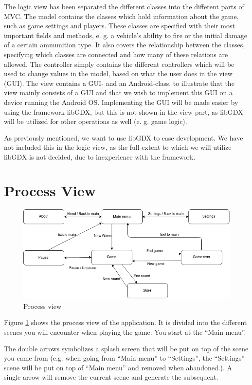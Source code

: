 The logic view has been separated the different classes into the different parts of MVC. The model contains the classes which hold information about the game, such as game settings and players. These classes are specified with their most important fields and methods, e. g. a vehicle’s ability to fire or the initial damage of a certain ammunition type. It also covers the relationship between the classes, specifying which classes are connected and how many of these relations are allowed.
The controller simply contains the different controllers which will be used to change values in the model, based on what the user does in the view (GUI).
The view contains a GUI- and an Android-class, to illustrate that the view mainly consists of a GUI and that we wish to implement this GUI on a device running the Android OS. Implementing the GUI will be made easier by using the framework libGDX, but this is not shown in the view part, as libGDX will be utilized for other operations as well (e. g. game logic). 

As previously mentioned, we want to use libGDX to ease development. We have not included this in the logic view, as the full extent to which we will utilize libGDX is not decided, due to inexperience with the framework. 


\section{Process View}
\begin{figure}
\centering
\includegraphics[scale=0.4]{images/process_view.png}
\caption{Process view}
\label{fig:process-view}
\end{figure}

Figure \ref{fig:process-view} shows the process view of the application. It is divided into the different scenes you will encounter when playing the game. You start at the “Main menu”. 

The double arrows symbolizes a splash screen that will be put on top of the scene you came from (e.g. when going from “Main menu” to “Settings”, the “Settings” scene will be put on top of “Main menu” and removed when abandoned.). A single arrow will remove the current scene and generate the subsequent.

